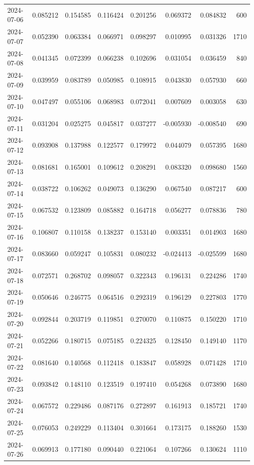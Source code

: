 \begin{tabular}{lrrrrrrr}
2024-07-06 & 0.085212 & 0.154585 & 0.116424 & 0.201256 & 0.069372 & 0.084832 & 600 \\
2024-07-07 & 0.052390 & 0.063384 & 0.066971 & 0.098297 & 0.010995 & 0.031326 & 1710 \\
2024-07-08 & 0.041345 & 0.072399 & 0.066238 & 0.102696 & 0.031054 & 0.036459 & 840 \\
2024-07-09 & 0.039959 & 0.083789 & 0.050985 & 0.108915 & 0.043830 & 0.057930 & 660 \\
2024-07-10 & 0.047497 & 0.055106 & 0.068983 & 0.072041 & 0.007609 & 0.003058 & 630 \\
2024-07-11 & 0.031204 & 0.025275 & 0.045817 & 0.037277 & -0.005930 & -0.008540 & 690 \\
2024-07-12 & 0.093908 & 0.137988 & 0.122577 & 0.179972 & 0.044079 & 0.057395 & 1680 \\
2024-07-13 & 0.081681 & 0.165001 & 0.109612 & 0.208291 & 0.083320 & 0.098680 & 1560 \\
2024-07-14 & 0.038722 & 0.106262 & 0.049073 & 0.136290 & 0.067540 & 0.087217 & 600 \\
2024-07-15 & 0.067532 & 0.123809 & 0.085882 & 0.164718 & 0.056277 & 0.078836 & 780 \\
2024-07-16 & 0.106807 & 0.110158 & 0.138237 & 0.153140 & 0.003351 & 0.014903 & 1680 \\
2024-07-17 & 0.083660 & 0.059247 & 0.105831 & 0.080232 & -0.024413 & -0.025599 & 1680 \\
2024-07-18 & 0.072571 & 0.268702 & 0.098057 & 0.322343 & 0.196131 & 0.224286 & 1740 \\
2024-07-19 & 0.050646 & 0.246775 & 0.064516 & 0.292319 & 0.196129 & 0.227803 & 1770 \\
2024-07-20 & 0.092844 & 0.203719 & 0.119851 & 0.270070 & 0.110875 & 0.150220 & 1710 \\
2024-07-21 & 0.052266 & 0.180715 & 0.075185 & 0.224325 & 0.128450 & 0.149140 & 1170 \\
2024-07-22 & 0.081640 & 0.140568 & 0.112418 & 0.183847 & 0.058928 & 0.071428 & 1710 \\
2024-07-23 & 0.093842 & 0.148110 & 0.123519 & 0.197410 & 0.054268 & 0.073890 & 1680 \\
2024-07-24 & 0.067572 & 0.229486 & 0.087176 & 0.272897 & 0.161913 & 0.185721 & 1740 \\
2024-07-25 & 0.076053 & 0.249229 & 0.113404 & 0.301664 & 0.173175 & 0.188260 & 1530 \\
2024-07-26 & 0.069913 & 0.177180 & 0.090440 & 0.221064 & 0.107266 & 0.130624 & 1110 \\

\end{tabular}
